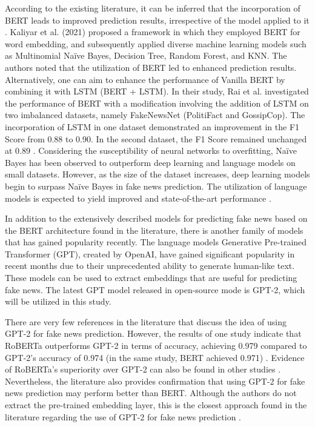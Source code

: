 According to the existing literature, it can be inferred that the incorporation of BERT leads to improved prediction results, irrespective of the model applied to it \autocite{Kaliyar2021}. Kaliyar et al. (2021) proposed a framework in which they employed BERT for word embedding, and subsequently applied diverse machine learning models such as Multinomial Naïve Bayes, Decision Tree, Random Forest, and KNN. The authors noted that the utilization of BERT led to enhanced prediction results. Alternatively, one can aim to enhance the performance of Vanilla BERT by combining it with LSTM (BERT + LSTM). In their study, Rai et al. investigated the performance of BERT with a modification involving the addition of LSTM on two imbalanced datasets, namely FakeNewsNet (PolitiFact and GossipCop). The incorporation of LSTM in one dataset demonstrated an improvement in the F1 Score from 0.88 to 0.90. In the second dataset, the F1 Score remained unchanged at 0.89 \autocite{Rai2022}.
Considering the susceptibility of neural networks to overfitting, Naïve Bayes has been observed to outperform deep learning and language models on small datasets. However, as the size of the dataset increases, deep learning models begin to surpass Naïve Bayes in fake news prediction. The utilization of language models is expected to yield improved and state-of-the-art performance \autocite{Khan2021}.


In addition to the extensively described models for predicting fake news based on the BERT architecture found in the literature, there is another family of models that has gained popularity recently. The language models Generative Pre-trained Transformer (GPT), created by OpenAI, have gained significant popularity in recent months due to their unprecedented ability to generate human-like text. These models can be used to extract embeddings that are useful for predicting fake news. The latest GPT model released in open-source mode is GPT-2, which will be utilized in this study.

There are very few references in the literature that discuss the idea of using GPT-2 for fake news prediction. However, the results of one study indicate that RoBERTa outperforms GPT-2 in terms of accuracy, achieving 0.979 compared to GPT-2's accuracy of 0.974 (in the same study, BERT achieved 0.971) \autocite{Shifath2021}. Evidence of RoBERTa's superiority over GPT-2 can also be found in other studies \autocite{Cruz2019}. Nevertheless, the literature also provides confirmation that using GPT-2 for fake news prediction may perform better than BERT. Although the authors do not extract the pre-trained embedding layer, this is the closest approach found in the literature regarding the use of GPT-2 for fake news prediction \autocite{Goel2021}.

